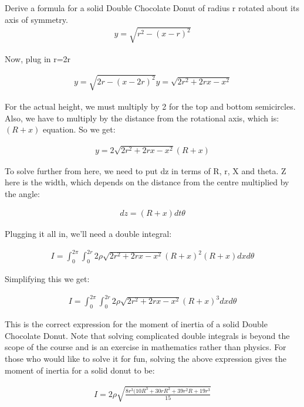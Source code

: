 \begin{problem}{Derive a formula for a solid Double Chocolate Donut of radius r rotated about its axis of symmetry.}
\begin{align*}
y=\sqrt{r^{2}-(x-r)^{2}}
\end{align*}

Now, plug in r=2r

\begin{align*}
y=\sqrt{2r-(x-2r)^{2}}
y=\sqrt{2r^{2}+2rx-x^{2}}
\end{align*}

For the actual height, we must multiply by 2 for the top and bottom semicircles. Also, we have to multiply by the distance from the rotational axis, which is: $(R+x)$ equation. So we get:

\begin{align*}
y=2\sqrt{2r^{2}+2rx-x^{2}}(R+x)
\end{align*}

To solve further from here, we need to put dz in terms of R, r, X and theta. Z here is the width, which depends on the distance from the centre multiplied by the angle:

\begin{align*}
dz=(R+x)dt\theta
\end{align*}

Plugging it all in, we'll need a double integral:

\begin{align*}
I=\int_{0}^{2\pi}\int_{0}^{2r} 2\rho\sqrt{2r^{2}+2rx-x^{2}}(R+x)^{2}(R+x)dxd\theta
\end{align*}

Simplifying this we get:

\begin{align*}
I=\int_{0}^{2\pi}\int_{0}^{2r} 2\rho\sqrt{2r^{2}+2rx-x^{2}}(R+x)^{3}dxd\theta
\end{align*}

This is the correct expression for the moment of inertia of a solid Double Chocolate Donut. Note that solving complicated double integrals is beyond the scope of the course and is an exercise in mathematics rather than physics. For those who would like to solve it for fun, solving the above expression gives the moment of inertia for a solid donut to be:

\begin{align*}
I=2\rho \sqrt{\frac{8r^{3}(10R^{3}+30rR^{2}+39r^{2}R+19r^{3}}{15}}
\end{align*}
\end{problem}
